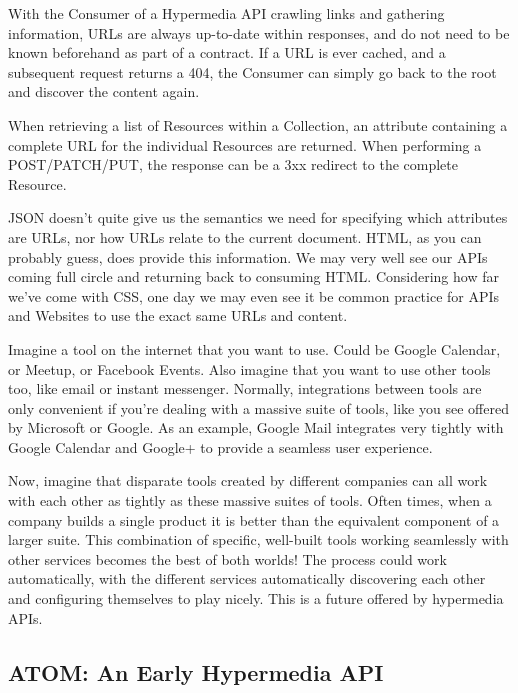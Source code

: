 \documentclass{book}
\begin{document}
With the Consumer of a Hypermedia API crawling links and gathering information, URLs are always up-to-date within responses, and do not need to be known beforehand as part of a contract. If a URL is ever cached, and a subsequent request returns a 404, the Consumer can simply go back to the root and discover the content again.

When retrieving a list of Resources within a Collection, an attribute containing a complete URL for the individual Resources are returned. When performing a POST/PATCH/PUT, the response can be a 3xx redirect to the complete Resource.

JSON doesn't quite give us the semantics we need for specifying which attributes are URLs, nor how URLs relate to the current document. HTML, as you can probably guess, does provide this information. We may very well see our APIs coming full circle and returning back to consuming HTML. Considering how far we've come with CSS, one day we may even see  it be common practice for APIs and Websites to use the exact same URLs and content.

Imagine a tool on the internet that you want to use. Could be Google Calendar, or Meetup, or Facebook Events. Also imagine that you want to use other tools too, like email or instant messenger. Normally, integrations between tools are only convenient if you're dealing with a massive suite of tools, like you see offered by Microsoft or Google. As an example, Google Mail integrates very tightly with Google Calendar and Google+ to provide a seamless user experience.

Now, imagine that disparate tools created by different companies can all work with each other as tightly as these massive suites of tools. Often times, when a company builds a single product it is better than the equivalent component of a larger suite. This combination of specific, well-built tools working seamlessly with other services becomes the best of both worlds! The process could work automatically, with the different services automatically discovering each other and configuring themselves to play nicely. This is a future offered by hypermedia APIs.

\subsection{ATOM: An Early Hypermedia API}
\end{document}

